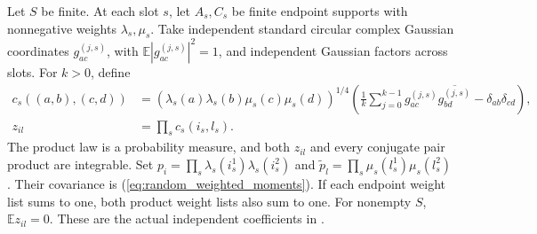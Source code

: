 \begin{theorem}
    \label{thm:random_gaussian_slots}
    \leanok
    Let $S$ be finite. At each slot $s$, let $A_s,C_s$ be finite endpoint
    supports with nonnegative weights $\lambda_s,\mu_s$. Take independent
    standard circular complex Gaussian coordinates $g^{(j,s)}_{ac}$, with
    $\mathbb E|g^{(j,s)}_{ac}|^2=1$, and independent Gaussian factors across
    slots. For $k>0$, define
    \begin{align}
        c_s((a,b),(c,d))
               & =(\lambda_s(a)\lambda_s(b)\mu_s(c)\mu_s(d))^{1/4}
        \left(\frac1k\sum_{j=0}^{k-1}
        g^{(j,s)}_{ac}\overline{g^{(j,s)}_{bd}}
        -\delta_{ab}\delta_{cd}\right),
        \label{eq:random_gaussian_slot}                            \\
        z_{il} & =\prod_s c_s(i_s,l_s).
        \label{eq:random_gaussian_product}
    \end{align}
    The product law is a probability measure, and both $z_{il}$ and every
    conjugate pair product are integrable. Set
    $p_i=\prod_s\lambda_s(i_s^1)\lambda_s(i_s^2)$ and
    $\widetilde p_l=\prod_s\mu_s(l_s^1)\mu_s(l_s^2)$.
    Their covariance is (\ref{eq:random_weighted_moments}). If each endpoint
    weight list sums to one, both product weight lists also sum to one.
    For nonempty $S$, $\mathbb E z_{il}=0$.
    These are the actual independent coefficients in
    \cite[Equations~(5.7), (5.8), and~(5.11)]{OpenAI2026PolynomialPEPS}.
\end{theorem}

